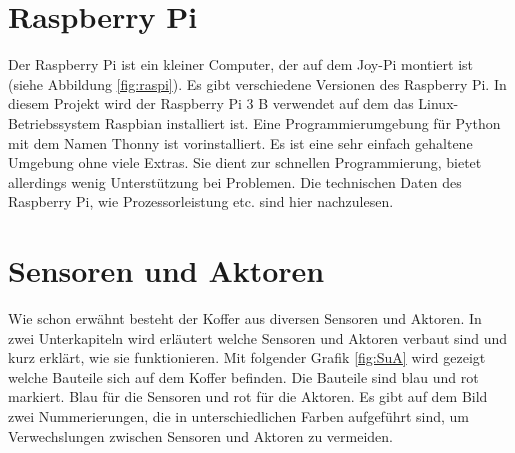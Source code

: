 \section{Raspberry Pi}\label{sec:Raspberrypi}
Der Raspberry Pi ist ein kleiner Computer, der auf dem Joy-Pi montiert ist (siehe Abbildung \ref{fig:raspi}). Es gibt verschiedene Versionen des Raspberry Pi. In diesem Projekt wird der Raspberry Pi 3 B verwendet auf dem das Linux-Betriebssystem Raspbian installiert ist. Eine Programmierumgebung für Python mit dem Namen Thonny ist vorinstalliert. Es ist eine sehr einfach gehaltene Umgebung ohne viele Extras. Sie dient zur schnellen Programmierung, bietet allerdings wenig Unterstützung bei Problemen. Die technischen Daten des Raspberry Pi, wie Prozessorleistung etc. sind hier \cite{latex:raspberrypi} nachzulesen.
\begin{figure}[H] %
\end{figure} %
\section{Sensoren und Aktoren}
Wie schon erwähnt besteht der Koffer aus diversen Sensoren und Aktoren. In zwei Unterkapiteln wird erläutert welche Sensoren und Aktoren verbaut sind und kurz erklärt, wie sie funktionieren. Mit folgender Grafik \ref{fig:SuA} wird gezeigt welche Bauteile sich auf dem Koffer befinden. Die Bauteile sind blau und rot markiert. Blau für die Sensoren und rot für die Aktoren. Es gibt auf dem Bild zwei Nummerierungen, die in unterschiedlichen Farben aufgeführt sind, um Verwechslungen zwischen Sensoren und Aktoren zu vermeiden.
\begin{figure}[H] %
\end{figure} %

